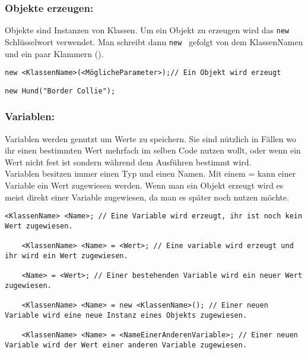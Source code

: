 \begin{Infobox}
	
	\subsubsection*{Objekte erzeugen:}
	Objekte sind Instanzen von Klassen.
	Um ein Objekt zu erzeugen wird das \lstinline{new} Schlüsselwort verwendet.
	Man schreibt dann \lstinline{new } gefolgt von dem KlassenNamen und ein paar Klammern ().
\end{Infobox}
\begin{lstlisting}[title=\textbf{Objekt erstellen Syntax}]
	new <KlassenName>(<MöglicheParameter>);// Ein Objekt wird erzeugt
\end{lstlisting}

\begin{lstlisting}[title=\textbf{Objekt erstellen Beispiel}]
	new Hund("Border Collie");
\end{lstlisting}
\begin{Infobox}
	\subsubsection*{Variablen:}
	Variablen werden genutzt um Werte zu speichern.
	Sie sind nützlich in Fällen wo ihr einen bestimmten Wert mehrfach im selben Code nutzen wollt, oder wenn ein Wert nicht fest ist sondern während dem Ausführen bestimmt wird.\\
	Variablen besitzen immer einen Typ und einen Namen.
	Mit einem = kann einer Variable ein Wert zugewiesen werden.
	Wenn man ein Objekt erzeugt wird es meist direkt einer Variable zugewiesen, da man es später noch nutzen möchte.
\end{Infobox}
\begin{lstlisting}[title=\textbf{Variablen Syntax}]
	<KlassenName> <Name>; // Eine Variable wird erzeugt, ihr ist noch kein Wert zugewiesen.
	
	<KlassenName> <Name> = <Wert>; // Eine variable wird erzeugt und ihr wird ein Wert zugewiesen.
	
	<Name> = <Wert>; // Einer bestehenden Variable wird ein neuer Wert zugewiesen.
	
	<KlassenName> <Name> = new <KlassenName>(); // Einer neuen Variable wird eine neue Instanz eines Objekts zugewiesen.
	
	<KlassenName> <Name> = <NameEinerAnderenVariable>; // Einer neuen Variable wird der Wert einer anderen Variable zugewiesen. 
\end{lstlisting}
